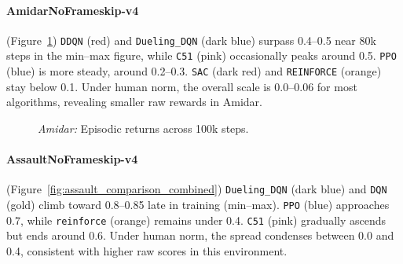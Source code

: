 \paragraph{AmidarNoFrameskip-v4}
(Figure~\ref{fig:amidar_comparison_combined})
\texttt{DDQN} (red) and \texttt{Dueling\_DQN} (dark blue) surpass 0.4--0.5 near 80k steps 
in the min--max figure, while \texttt{C51} (pink) occasionally peaks around 0.5. 
\texttt{PPO} (blue) is more steady, around 0.2--0.3. \texttt{SAC} (dark red) 
and \texttt{REINFORCE} (orange) stay below 0.1. 
Under human norm, the overall scale is 0.0--0.06 for most algorithms, 
revealing smaller raw rewards in Amidar.

\begin{figure} 
	\centering
	\quad
	\caption{\emph{Amidar:} Episodic returns across 100k steps.}
	\label{fig:amidar_comparison_combined}
\end{figure}

\paragraph{AssaultNoFrameskip-v4}
(Figure~\ref{fig:assault_comparison_combined})
\texttt{Dueling\_DQN} (dark blue) and \texttt{DQN} (gold) climb toward 0.8--0.85 
late in training (min--max). 
\texttt{PPO} (blue) approaches 0.7, while \texttt{reinforce} (orange) remains 
under 0.4. \texttt{C51} (pink) gradually ascends but ends around 0.6. 
Under human norm, the spread condenses between 0.0 and 0.4, consistent with higher 
raw scores in this environment.

